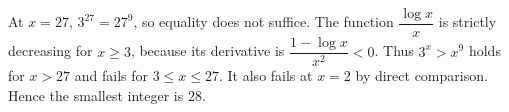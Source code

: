 At $x=27$, $3^{27}=27^9$, so equality does not suffice. The function $\dfrac{\log x}{x}$ is strictly decreasing for $x\ge3$, because its derivative is $\dfrac{1-\log x}{x^2}<0$. Thus $3^x>x^9$ holds for $x>27$ and fails for $3\le x\le27$. It also fails at $x=2$ by direct comparison. Hence the smallest integer is $\boxed{28}$.
